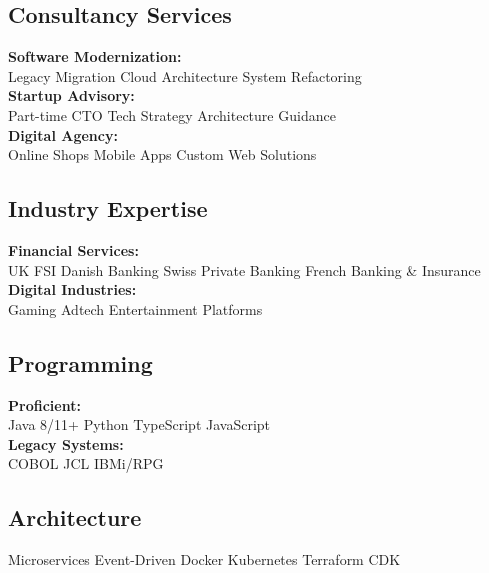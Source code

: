 \documentclass[10pt]{article}
\newcommand{\sectionsep}{\vspace{1.5pt}}
\newcommand{\subsectionsep}{\vspace{0.5pt}}
\begin{document}
\begin{paracol}{2}
\subsection{Consultancy Services}
\subsectionsep
\textbf{Software Modernization:}\\
Legacy Migration \textbullet{} Cloud Architecture \textbullet{} System Refactoring \\
\subsectionsep
\textbf{Startup Advisory:}\\
Part-time CTO \textbullet{} Tech Strategy \textbullet{} Architecture Guidance \\
\subsectionsep
\textbf{Digital Agency:}\\
Online Shops \textbullet{} Mobile Apps \textbullet{} Custom Web Solutions \\
\sectionsep

\subsection{Industry Expertise}
\subsectionsep
\textbf{Financial Services:}\\
UK FSI \textbullet{} Danish Banking \textbullet{} Swiss Private Banking \textbullet{} French Banking \& Insurance \\
\subsectionsep
\textbf{Digital Industries:}\\
Gaming \textbullet{} Adtech \textbullet{} Entertainment Platforms \\
\sectionsep

\subsection{Programming}
\subsectionsep
\textbf{Proficient:}\\
Java 8/11+ \textbullet{} Python \textbullet{} TypeScript \textbullet{} JavaScript \\
\subsectionsep
\textbf{Legacy Systems:}\\
COBOL \textbullet{} JCL \textbullet{} IBMi/RPG \\
\sectionsep

\subsection{Architecture}
\subsectionsep
Microservices \textbullet{} Event-Driven \textbullet{} Docker \textbullet{} Kubernetes \textbullet{} Terraform \textbullet{} CDK \\
\sectionsep



\end{paracol}
\end{document}
